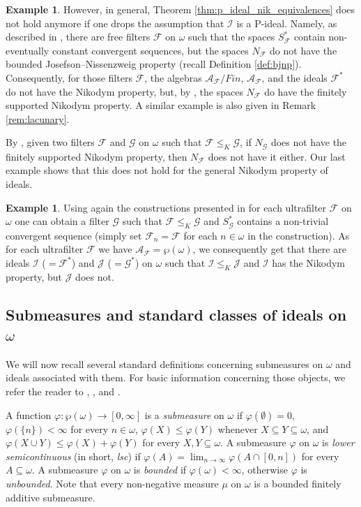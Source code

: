 \documentclass[a4paper,11pt,fleqn]{amsart}
\theoremstyle{definition}
\newtheorem{example}[theorem]{Example}
\theoremstyle{remark}
\numberwithin{equation}{section}
\newcommand{\N}{\mathbb{N}}
\newcommand{\aA}{\mathcal{A}}
\newcommand{\fF}{\mathcal{F}}
\newcommand{\gG}{\mathcal{G}}
\newcommand{\iI}{\mathcal{I}}
\newcommand{\jJ}{\mathcal{J}}
\newcommand{\sub}{\subseteq}
\newcommand{\io}{\in\omega}%
\newcommand{\wo}{{\wp(\omega)}}%
\begin{document}
\begin{example}
    However, in general, Theorem \ref{thm:p_ideal_nik_equivalences} does not hold anymore if one drops the assumption that $\iI$ is a P-ideal. Namely, as described in \cite[Sections 4 and 6.3]{MS24}, there are free filters $\fF$ on $\omega$ such that the spaces $S_\fF^*$ contain non-eventually constant convergent sequences, but the spaces $N_\fF$ do not have the bounded Josefson--Nissenzweig property (recall Definition \ref{def:bjnp}). Consequently, for those filters $\fF$, the algebras $\aA_\fF/Fin$, $\aA_\fF$, and the ideals $\fF^*$ do not have the Nikodym property, but, by \cite[Proposition 6.1]{Zuc25}, the spaces $N_\fF$ do have the finitely supported Nikodym property. A similar example is also given in Remark \ref{rem:lacunary}.
\end{example}

By \cite[Proposition 5.2]{Zuc25}, given two filters $\fF$ and $\gG$ on $\omega$ such that $\fF\le_K\gG$, if $N_\gG$ does not have the finitely supported Nikodym property, then $N_\fF$ does not have it either. Our last example shows that this does not hold for the general Nikodym property of ideals.

\begin{example}
    Using again the constructions presented in \cite[Sections 4 and 6.3]{MS24} for each ultrafilter $\fF$ on $\omega$ one can obtain a filter $\gG$ such that $\fF\le_K\gG$ and $S_\gG^*$ contains a non-trivial convergent sequence (simply set $\fF_n=\fF$ for each $n\io$ in the construction). As for each ultrafilter $\fF$ we have $\aA_\fF=\wo$, we consequently get that there are ideals $\iI$ ($=\fF^*$) and $\jJ$ ($=\gG^*$) on $\omega$ such that $\iI\le_K\jJ$ and $\iI$ has the Nikodym property, but $\jJ$ does not.
\end{example}

\subsection{Submeasures and standard classes of ideals on $\omega$\label{sec:nonpath}}

We will now recall several standard definitions concerning submeasures on $\omega$ and ideals associated with them. For basic information concerning those objects, we refer the reader to \cite{BNFP15}, \cite{Far00}, and \cite{Hru17}.

A function $\varphi\colon\wo\to[0,\infty]$ is a \textit{submeasure} on $\omega$ if $\varphi(\emptyset)=0$, $\varphi(\{n\})<\infty$ for every $n\in\omega$, $\varphi(X)\leq\varphi(Y)$ whenever $X\sub Y\sub\omega$, and $\varphi(X\cup Y)\leq\varphi(X)+\varphi(Y)$ for every $X, Y\sub\omega$. A submeasure $\varphi$ on $\omega$ is \textit{lower semicontinuous} (in short, \textit{lsc}) if $\varphi(A)=\lim_{n\to\infty}\varphi(A\cap [0,n])$ for every $A\sub\omega$. %
A submeasure $\varphi$ on $\omega$ is \textit{bounded} if $\varphi(\omega)<\infty$, otherwise $\varphi$ is \textit{unbounded}. Note that every non-negative measure $\mu$ on $\omega$ is a bounded finitely additive submeasure.
\end{document}
